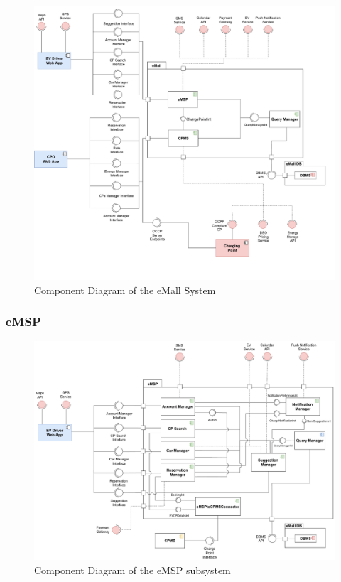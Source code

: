 \begin{figure}[H]
    \centering
    \hspace*{-2cm}
    \includegraphics[scale=0.5]{src/ComponentDiagram/overview_component_diagram.pdf}
    \caption{Component Diagram of the eMall System}
\end{figure}


\subsubsection{eMSP}

\begin{figure}[H]
    \centering
    \hspace*{-2cm}
    \includegraphics[scale=0.48]{src/ComponentDiagram/emsp_component_diagram.pdf}
    \caption{Component Diagram of the eMSP subsystem}
\end{figure}

